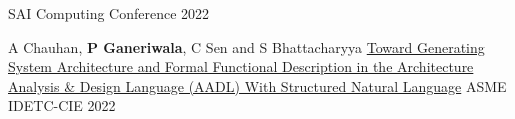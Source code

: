 \begin{cventries}
{}
{SAI Computing Conference 2022} 
{ %
\begin{cvitems}
\end{cvitems}
}
\cventry
{A Chauhan, \textbf{P Ganeriwala}, C Sen and S Bhattacharyya}
{\href{https://asmedigitalcollection.asme.org/IDETC-CIE/proceedings-abstract/IDETC-CIE2022/86212/1150294}{Toward Generating System Architecture and Formal Functional Description in the Architecture Analysis \& Design Language (AADL) With Structured Natural Language}}
{}
{ASME IDETC-CIE 2022} 
{ %
\begin{cvitems}
\end{cvitems}
}


\end{cventries}